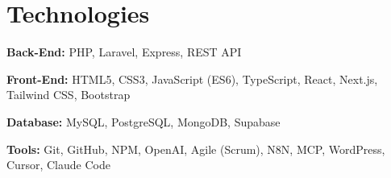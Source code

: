 \section{Technologies}

\vspace{0.2 cm}
\begin{onecolentry}
    \textbf{Back-End:} PHP, Laravel, Express, REST API %
\end{onecolentry}

\vspace{0.2 cm}
\begin{onecolentry}
    \textbf{Front-End:} HTML5, CSS3, JavaScript (ES6), TypeScript, React, Next.js, Tailwind CSS, Bootstrap %
\end{onecolentry}

\vspace{0.2 cm}
\begin{onecolentry}
    \textbf{Database:} MySQL, PostgreSQL, MongoDB, Supabase %
\end{onecolentry}

\vspace{0.2 cm}
\begin{onecolentry}
    \textbf{Tools:} Git, GitHub, NPM, OpenAI, Agile (Scrum), N8N, MCP, WordPress, Cursor, Claude Code
\end{onecolentry}
